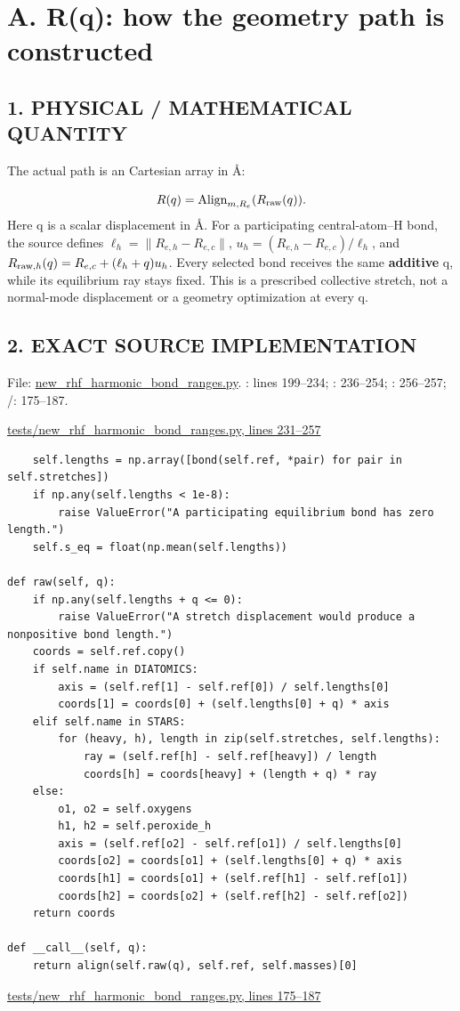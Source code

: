\documentclass[10pt,a4paper]{article}
\begin{document}
\clearpage
\section{A. R(q): how the geometry path is constructed}
\subsection{1. PHYSICAL / MATHEMATICAL QUANTITY}
The actual path is an  Cartesian array in Å:

\[
R(q)=\operatorname{Align}_{m,R_e}(R_{\rm raw}(q)).
\]
Here q is a scalar displacement in Å. For a participating central-atom–H bond, the source defines \(\ell_h=\|R_{e,h}-R_{e,c}\|\), \(u_h=(R_{e,h}-R_{e,c})/\ell_h\), and \(R_{{\rm raw},h}(q)=R_{e,c}+(\ell_h+q)u_h\). Every selected bond receives the same \textbf{additive} q, while its equilibrium ray stays fixed. This is a prescribed collective stretch, not a normal-mode displacement or a geometry optimization at every q.

\subsection{2. EXACT SOURCE IMPLEMENTATION}
File: \href{/Users/novaz/Desktop/qml2.0/tests/new\_rhf\_harmonic\_bond\_ranges.py:199}{new\_rhf\_harmonic\_bond\_ranges.py}. : lines 199–234; : 236–254; : 256–257; /: 175–187.

\href{/Users/novaz/Desktop/qml2.0/tests/new\_rhf\_harmonic\_bond\_ranges.py:231}{tests/new\_rhf\_harmonic\_bond\_ranges.py, lines 231–257}

\begin{Verbatim}
    self.lengths = np.array([bond(self.ref, *pair) for pair in self.stretches])
    if np.any(self.lengths < 1e-8):
        raise ValueError("A participating equilibrium bond has zero length.")
    self.s_eq = float(np.mean(self.lengths))

def raw(self, q):
    if np.any(self.lengths + q <= 0):
        raise ValueError("A stretch displacement would produce a nonpositive bond length.")
    coords = self.ref.copy()
    if self.name in DIATOMICS:
        axis = (self.ref[1] - self.ref[0]) / self.lengths[0]
        coords[1] = coords[0] + (self.lengths[0] + q) * axis
    elif self.name in STARS:
        for (heavy, h), length in zip(self.stretches, self.lengths):
            ray = (self.ref[h] - self.ref[heavy]) / length
            coords[h] = coords[heavy] + (length + q) * ray
    else:
        o1, o2 = self.oxygens
        h1, h2 = self.peroxide_h
        axis = (self.ref[o2] - self.ref[o1]) / self.lengths[0]
        coords[o2] = coords[o1] + (self.lengths[0] + q) * axis
        coords[h1] = coords[o1] + (self.ref[h1] - self.ref[o1])
        coords[h2] = coords[o2] + (self.ref[h2] - self.ref[o2])
    return coords

def __call__(self, q):
    return align(self.raw(q), self.ref, self.masses)[0]
\end{Verbatim}
\href{/Users/novaz/Desktop/qml2.0/tests/new\_rhf\_harmonic\_bond\_ranges.py:175}{tests/new\_rhf\_harmonic\_bond\_ranges.py, lines 175–187}
\end{document}
